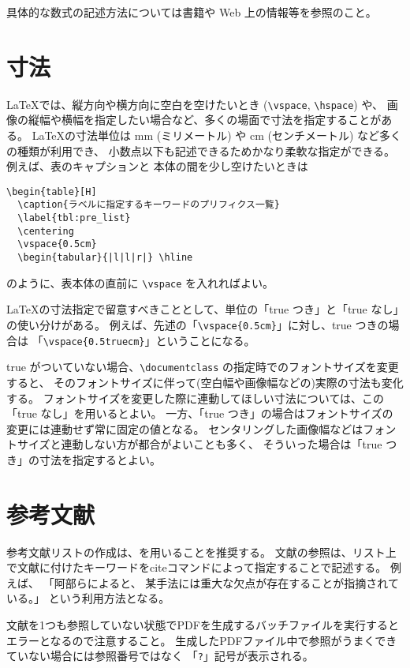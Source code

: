 具体的な数式の記述方法については書籍や Web 上の情報等を参照のこと。

\section{寸法}

\LaTeX では、縦方向や横方向に空白を空けたいとき (\verb+\vspace+, \verb+\hspace+) や、
画像の縦幅や横幅を指定したい場合など、多くの場面で寸法を指定することがある。
\LaTeX の寸法単位は mm (ミリメートル) や cm (センチメートル) など多くの種類が利用でき、
小数点以下も記述できるためかなり柔軟な指定ができる。例えば、表のキャプションと
本体の間を少し空けたいときは
\begin{verbatim}
\begin{table}[H]
  \caption{ラベルに指定するキーワードのプリフィクス一覧}
  \label{tbl:pre_list}
  \centering
  \vspace{0.5cm}
  \begin{tabular}{|l|l|r|} \hline
\end{verbatim}
のように、表本体の直前に \verb+\vspace+ を入れればよい。

\LaTeX の寸法指定で留意すべきこととして、単位の「true つき」と「true なし」の使い分けがある。
例えば、先述の「\verb+\vspace{0.5cm}+」に対し、true つきの場合は
「\verb+\vspace{0.5truecm}+」ということになる。

true がついていない場合、\verb+\documentclass+ の指定時でのフォントサイズを変更すると、
そのフォントサイズに伴って(空白幅や画像幅などの)実際の寸法も変化する。
フォントサイズを変更した際に連動してほしい寸法については、この「true なし」を用いるとよい。
一方、「true つき」の場合はフォントサイズの変更には連動せず常に固定の値となる。
センタリングした画像幅などはフォントサイズと連動しない方が都合がよいことも多く、
そういった場合は「true つき」の寸法を指定するとよい。

\section{参考文献}
\label{sec:bib}

参考文献リストの作成は、\BibTeX を用いることを推奨する。
文献の参照は、リスト上で文献に付けたキーワードをciteコマンドによって指定することで記述する。
例えば、
「阿部ら\cite{abeJ}によると、
某手法\cite{nowrouzezahrai}には重大な欠点が存在することが指摘されている。」
という利用方法となる。

文献を1つも参照していない状態でPDFを生成するバッチファイルを実行するとエラーとなるので注意すること。
生成したPDFファイル中で参照がうまくできていない場合には参照番号ではなく
「\verb+?+」記号が表示される。

